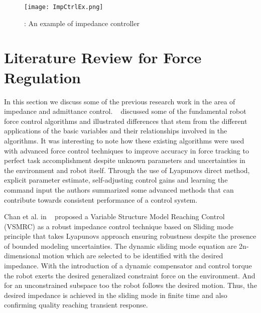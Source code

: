 \documentclass[10pt,journal,compsoc]{IEEEtran}
\begin{document}
\begin{figure}[htbp]
\begin{center}
\texttt{[image: ImpCtrlEx.png]}
\caption{: An example of impedance controller~\cite{chen2014}}
\label{fig:ImpCtrlEx}
\end{center}
\end{figure}

\section{Literature Review for Force Regulation}
In this section we discuss some of the previous research work in the area of impedance and admittance control.
~\cite{zeng1996} discussed some of the fundamental robot force control algorithms and illustrated differences that stem from the different applications of the basic variables and their relationships involved in the algorithms. It was interesting to note how these existing algorithms were used with advanced force control techniques to improve accuracy in force tracking to perfect task accomplishment despite unknown parameters and uncertainties in the environment and robot itself. Through the use of Lyapunov\textquotesingle s direct method, explicit parameter estimate, self-adjusting control gains and learning the command input the authors summarized some advanced methods that can contribute towards consistent performance of a control system.

Chan et al. in ~\cite{chan1991} proposed a Variable Structure Model Reaching Control (VSMRC) as a robust impedance control technique based on Sliding mode principle that takes Lyapunov\textquotesingle s approach ensuring robustness despite the presence of bounded modeling uncertainties. The dynamic sliding mode equation are 2n-dimensional motion which are selected to be identified with the desired impedance. With the introduction of a dynamic compensator and control torque the robot exerts the desired generalized constraint force on the environment. And for an unconstrained subspace too the robot follows the desired motion. Thus, the desired impedance is achieved in the sliding mode in finite time and also confirming quality reaching transient response.
\end{document}
